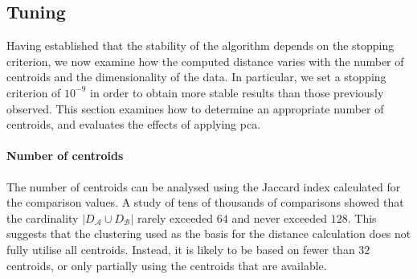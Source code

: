\begin{toReview}
	\subsection{Tuning} Having established that the stability of the algorithm depends on the stopping criterion, we now examine how the computed distance varies with the number of centroids and the dimensionality of the data. In particular, we set a stopping criterion of $10^{-9}$ in order to obtain more stable results than those previously observed. This section examines how to determine an appropriate number of centroids, and evaluates the effects of applying \gls{pca}.

	\paragraph{Number of centroids} The number of centroids can be analysed using the Jaccard index calculated for the comparison values. A study of tens of thousands of comparisons showed that the cardinality $\left|D_\mathcal{A}\cup D_\mathcal{B}\right|$ rarely exceeded $64$ and never exceeded $128$. This suggests that the clustering used as the basis for the distance calculation does not fully utilise all centroids. Instead, it is likely to be based on fewer than $32$ centroids, or only partially using the centroids that are available.


\end{toReview}
